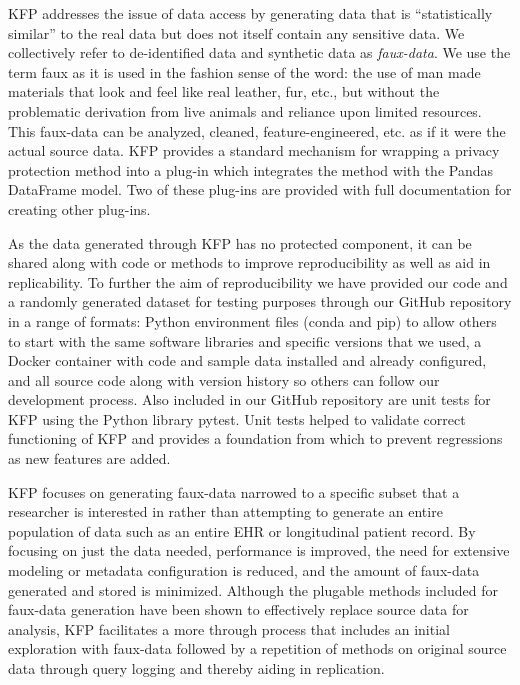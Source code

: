 \documentclass{amia}
\begin{document}
KFP addresses the issue of data access by generating data that is ``statistically similar'' to the real data but does not itself contain any sensitive data. We collectively refer to de-identified data and synthetic data as \emph{faux-data}. We use the term faux as it is used in the fashion sense of the word: the use of man made materials that look and feel like real leather, fur, etc., but without the problematic derivation from live animals and reliance upon limited resources. This faux-data can be analyzed, cleaned, feature-engineered, etc. as if it were the actual source data. KFP provides a standard mechanism for wrapping a privacy protection method into a plug-in which integrates the method with the Pandas DataFrame model. Two of these plug-ins are provided with full documentation for creating other plug-ins.

As the data generated through KFP has no protected component, it can be shared along with code or methods to improve reproducibility as well as aid in replicability. To further the aim of reproducibility we have provided our code and a randomly generated dataset for testing purposes through our GitHub repository in a range of formats: Python environment files (conda and pip) to allow others to start with the same software libraries and specific versions that we used, a Docker \cite{merkel_docker, docker_website} container with code and sample data installed and already configured, and all source code along with version history so others can follow our development process. Also included in our GitHub repository are unit tests for KFP using the Python library pytest. Unit tests helped to validate correct functioning of KFP and provides a foundation from which to prevent regressions as new features are added. 

KFP focuses on generating faux-data narrowed to a specific subset that a researcher is interested in rather than attempting to generate an entire population of data such as an entire EHR or longitudinal patient record. By focusing on just the data needed, performance is improved, the need for extensive modeling or metadata configuration is reduced, and the amount of faux-data generated and stored is minimized. Although the plugable methods included for faux-data generation have been shown to effectively replace source data for analysis, KFP facilitates a more through process that includes an initial exploration with faux-data followed by a repetition of methods on original source data through query logging and thereby aiding in replication.
\end{document}
